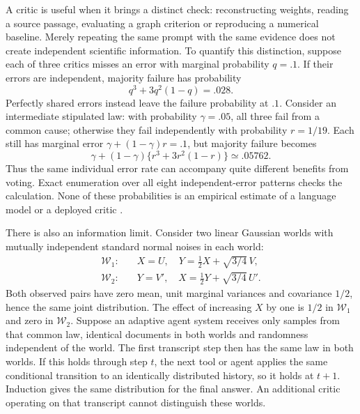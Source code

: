 A critic is useful when it brings a distinct check: reconstructing weights,
reading a source passage, evaluating a graph criterion or reproducing a
numerical baseline. Merely repeating the same prompt with the same evidence
does not create independent scientific information. To quantify this
distinction, suppose each of three critics misses an error with marginal
probability $q=.1$. If their errors are independent, majority failure has
probability
\begin{equation}
 q^3+3q^2(1-q)=.028.
 \label{exec13:architecture-majority}
\end{equation}
Perfectly shared errors instead leave the failure probability at $.1$.
Consider an intermediate stipulated law: with probability $\gamma=.05$,
all three fail from a common cause; otherwise they fail independently with
probability $r=1/19$. Each still has marginal error
$\gamma+(1-\gamma)r=.1$, but majority failure becomes
\begin{equation}
 \gamma+(1-\gamma)\{r^3+3r^2(1-r)\}\simeq .05762.
 \label{exec13:architecture-common-error}
\end{equation}
Thus the same individual error rate can accompany quite different benefits
from voting. Exact enumeration over all eight independent-error patterns
checks the calculation. None of these probabilities is an empirical estimate
of a language model or a deployed critic \cite{exec13_architecture_exact}.

There is also an information limit. Consider two linear Gaussian worlds with
mutually independent standard normal noises in each world:
\begin{align}
 \mathcal W_1:&\quad X=U,\quad Y=\tfrac12X+\sqrt{3/4}\,V,\nonumber\\
 \mathcal W_2:&\quad Y=V',\quad X=\tfrac12Y+\sqrt{3/4}\,U'.
 \label{exec13:architecture-worlds}
\end{align}
Both observed pairs have zero mean, unit marginal variances and covariance
$1/2$, hence the same joint distribution. The effect of increasing $X$ by
one is $1/2$ in $\mathcal W_1$ and zero in $\mathcal W_2$. Suppose an
adaptive agent system receives only samples from that common law, identical
documents in both worlds and randomness independent of the world. The first
transcript step then has the same law in both worlds. If this holds through
step $t$, the next tool or agent applies the same conditional transition to
an identically distributed history, so it holds at $t+1$. Induction gives the
same distribution for the final answer. An additional critic operating on
that transcript cannot distinguish these worlds.

